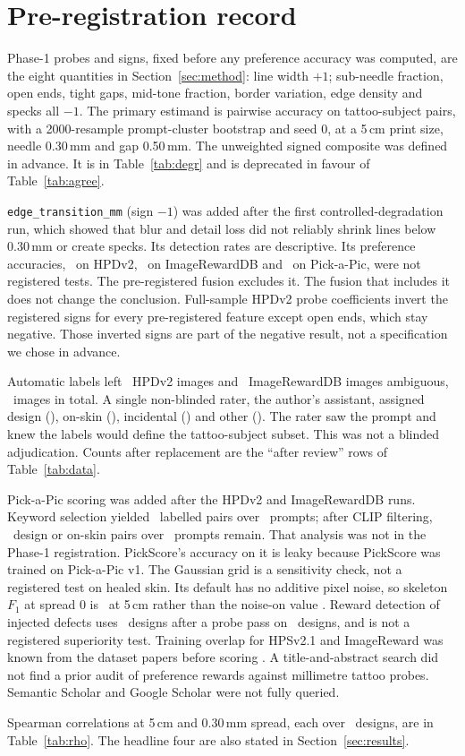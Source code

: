 \section{Pre-registration record}
\label{app:prereg}

Phase-1 probes and signs, fixed before any preference accuracy was computed, are the eight quantities in Section~\ref{sec:method}: line width $+1$; sub-needle fraction, open ends, tight gaps, mid-tone fraction, border variation, edge density and specks all $-1$.
The primary estimand is pairwise accuracy on tattoo-subject pairs, with a 2000-resample prompt-cluster bootstrap and seed 0, at a 5\,cm print size, needle 0.30\,mm and gap 0.50\,mm.
The unweighted signed composite was defined in advance.
It is in Table~\ref{tab:degr} and is deprecated in favour of Table~\ref{tab:agree}.

\texttt{edge\_transition\_mm} (sign $-1$) was added after the first controlled-degradation run, which showed that blur and detail loss did not reliably shrink lines below 0.30\,mm or create specks.
Its detection rates are descriptive.
Its preference accuracies, \HpdEdgetransitionmmfiveAcc\ on HPDv2, \IrEdgetransitionmmfiveAcc\ on ImageRewardDB and \PapEdgetransitionmmfiveAcc\ on Pick-a-Pic, were not registered tests.
The pre-registered fusion excludes it.
The fusion that includes it does not change the conclusion.
Full-sample HPDv2 probe coefficients invert the registered signs for every pre-registered feature except open ends, which stay negative.
Those inverted signs are part of the negative result, not a specification we chose in advance.

Automatic labels left \NHpdClsAmbiguous\ HPDv2 images and \NIrClsAmbiguous\ ImageRewardDB images ambiguous, \nAmb\ images in total.
A single non-blinded rater, the author's assistant, assigned design (\NambDesign), on-skin (\NambOnskin), incidental (\NambIncidental) and other (\NambOther).
The rater saw the prompt and knew the labels would define the tattoo-subject subset.
This was not a blinded adjudication.
Counts after replacement are the ``after review'' rows of Table~\ref{tab:data}.

Pick-a-Pic scoring was added after the HPDv2 and ImageRewardDB runs.
Keyword selection yielded \nPAPkwPairs\ labelled pairs over \nPAPkwPrompts\ prompts; after CLIP filtering, \PapHpstwoN\ design or on-skin pairs over \NPapTsprompts\ prompts remain.
That analysis was not in the Phase-1 registration.
PickScore's accuracy on it is leaky because PickScore was trained on Pick-a-Pic v1.
The Gaussian grid is a sensitivity check, not a registered test on healed skin.
Its default has no additive pixel noise, so skeleton $F_1$ at spread 0 is \ssFoneSizeFiveSpreadZero\ at 5\,cm rather than the noise-on value \ssNoiseFoneFive.
Reward detection of injected defects uses \nDegrRewDesigns\ designs after a probe pass on \nDegrDesigns\ designs, and is not a registered superiority test.
Training overlap for HPSv2.1 and ImageReward was known from the dataset papers before scoring \citep{wu2023hpsv2,xu2023imagereward}.
A title-and-abstract search did not find a prior audit of preference rewards against millimetre tattoo probes.
Semantic Scholar and Google Scholar were not fully queried.

Spearman correlations at 5\,cm and 0.30\,mm spread, each over \nDegrDesigns\ designs, are in Table~\ref{tab:rho}.
The headline four are also stated in Section~\ref{sec:results}.


\enlargethispage{2\baselineskip}
